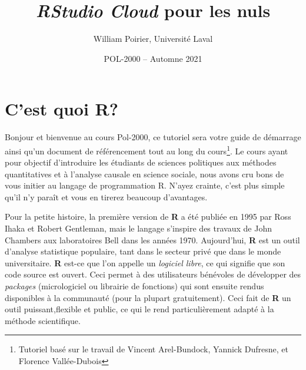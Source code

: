 \documentclass[10.5pt,a4paper]{article}
\title{\textbf{\emph{RStudio Cloud}} pour les nuls}
\author{William Poirier, Université Laval}
\date{POL-2000 -- Automne 2021}
\begin{document}
 

\restoregeometry %
\nopagecolor%

\tableofcontents

\pagebreak

\section{C'est quoi R?}
Bonjour et bienvenue au cours Pol-2000, ce tutoriel sera votre guide de démarrage ainsi qu'un document de référencement tout au long du cours\footnote{Tutoriel basé sur le travail de Vincent Arel-Bundock, Yannick Dufresne, et Florence Vallée-Dubois}. Le cours ayant pour objectif d'introduire les étudiants de sciences politiques aux méthodes quantitatives et à l'analyse causale en science sociale, nous avons cru bons de vous initier au langage de programmation R. N'ayez crainte, c'est plus simple qu'il n'y paraît et vous en tirerez beaucoup d'avantages. 

Pour la petite histoire, la première version de \textbf{R} a été publiée en 1995 par Ross Ihaka et Robert Gentleman, mais le langage s'inspire des travaux de John Chambers aux laboratoires Bell dans les années 1970. Aujourd'hui, \textbf{R} est un outil d'analyse statistique populaire, tant dans le secteur privé que dans le monde universitaire. \textbf{R} est-ce que l'on appelle un \textit{logiciel libre}, ce qui signifie que son code source est ouvert. Ceci permet à des utilisateurs bénévoles de développer des \textit{packages} (micrologiciel ou librairie de fonctions) qui sont ensuite rendus disponibles à la communauté (pour la plupart gratuitement). Ceci fait de \textbf{R} un outil puissant,flexible et public, ce qui le rend particulièrement adapté à la méthode scientifique. 
\end{document}
